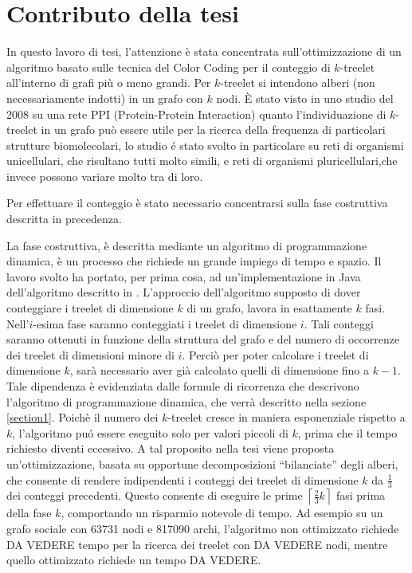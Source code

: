 \section{Contributo della tesi}

In questo lavoro di tesi, l'attenzione \`e stata concentrata  sull'ottimizzazione di un algoritmo basato sulle tecnica del Color Coding per il conteggio di $k$-treelet all'interno di grafi pi\`u o meno grandi.
Per $ k $-treelet  si intendono alberi (non necessariamente indotti) in un grafo con $ k $ nodi.
\`E stato visto in uno studio del 2008 \cite{alon2008biomolecular}  su una rete PPI (Protein-Protein Interaction) quanto l'individuazione di $ k $-treelet in un grafo pu\`o essere utile per la ricerca della frequenza di particolari strutture biomolecolari, lo studio \'e stato svolto in particolare su reti di organismi unicellulari, che risultano tutti molto simili, e reti di organismi pluricellulari,che invece possono variare molto tra di loro.

Per effettuare il conteggio \`e stato necessario concentrarsi sulla fase costruttiva descritta in precedenza.

La fase costruttiva, \`e descritta mediante un algoritmo di programmazione dinamica, \`e un processo che richiede un grande impiego di tempo e spazio.
Il lavoro svolto ha portato, per prima cosa, ad un'implementazione in Java dell'algoritmo descritto in \cite{bressan2018motif}.
L'approccio dell'algoritmo supposto di dover conteggiare i treelet di dimensione $ k $ di un grafo, lavora in esattamente $ k $ fasi.
Nell'$ i $-esima fase saranno conteggiati i treelet di dimensione $ i $.
Tali conteggi saranno ottenuti in funzione della struttura del grafo e del numero di occorrenze dei treelet di dimensioni minore di $ i $.
Perci\`o per poter calcolare i treelet di dimensione $ k $, sar\`a necessario aver gi\`a calcolato quelli di dimensione fino a $ k-1 $.
Tale dipendenza \`e evidenziata dalle formule di ricorrenza che descrivono l'algoritmo di programmazione dinamica, che verr\`a descritto nella sezione \ref{section1}.
Poich\`e il numero dei $ k $-treelet cresce in maniera esponenziale rispetto a $ k $, l'algoritmo pu\'o essere eseguito solo per valori piccoli di $ k $, prima che il tempo richiesto diventi eccessivo.
A tal proposito nella tesi viene proposta un'ottimizzazione, basata su opportune decomposizioni ``bilanciate'' degli alberi, che consente di rendere indipendenti i conteggi dei treelet di dimensione $ k $ da $\frac{1}{3}$ dei conteggi precedenti.
Questo consente di eseguire le prime $\left\lceil \frac{2}{3} k\right\rceil$  fasi prima della fase $ k $, comportando un risparmio notevole di tempo.
Ad esempio su un grafo sociale con 63731 nodi e 817090 archi, l'algoritmo non ottimizzato richiede DA VEDERE tempo per la ricerca dei treelet con DA VEDERE nodi, mentre quello ottimizzato richiede un tempo DA VEDERE.



